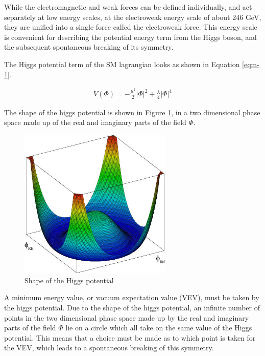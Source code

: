While the electromagnetic and weak forces can be defined individually, and act separately at low energy scales, at the electroweak energy scale of about 246 GeV, they are unified into a single force called the electroweak force. This energy scale is convenient for describing the potential energy term from the Higgs boson, and the subsequent spontaneous breaking of its symmetry.

The Higgs potential term of the SM lagrangian looks as shown in Equation \ref{eqm-1}.

\begin{eqnarray}
  V(\Phi) = - \frac{\mu^2}{2}\left|\Phi \right|^2
  +\frac{\lambda}{4} \left|\Phi \right|^4
  \label{eqm-1}
\end{eqnarray}

The shape of the higgs potential is shown in Figure \ref{fig:HiggsPotential}, in a two dimensional phase space made up of the real and imaginary parts of the field $\Phi$. 

\begin{figure}[H]
    \centering
    \includegraphics[width=0.65\textwidth]{Images/Theory/Higgs_Potential_Shape.png}
    \caption{Shape of the Higgs potential}
    \label{fig:HiggsPotential}
\end{figure}

A minimum energy value, or vacuum expectation value (VEV), must be taken by the higgs potential. Due to the shape of the higgs potential, an infinite number of points in the two dimensional phase space made up by the real and imaginary parts of the field $\Phi$ lie on a circle which all take on the same value of the Higgs potential. This means that a choice must be made as to which point is taken for the VEV, which leads to a spontaneous breaking of this symmetry. 

